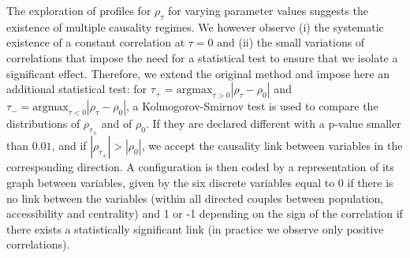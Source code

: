 \documentclass[11pt]{article}
\begin{document}
The exploration of profiles for $\rho_\tau$ for varying parameter values suggests the existence of multiple causality regimes. We however observe (i) the systematic existence of a constant correlation at $\tau = 0$ and (ii) the small variations of correlations that impose the need for a statistical test to ensure that we isolate a significant effect. Therefore, we extend the original method and impose here an additional statistical test: for $\tau_+ = \textrm{argmax}_{\tau>0} \left|\rho_{\tau} - \rho_0\right|$ and $\tau_- = \textrm{argmax}_{\tau<0} \left|\rho_{\tau} - \rho_0\right|$, a Kolmogorov-Smirnov test is used to compare the distributions of $\rho_{\tau_{\pm}}$ and of $\rho_0$. If they are declared different with a p-value smaller than $0.01$, and if $\left|\rho_{\tau_{\pm}}\right| > \left|\rho_0\right|$, we accept the causality link between variables in the corresponding direction. A configuration is then coded by a representation of its graph between variables, given by the six discrete variables equal to 0 if there is no link between the variables (within all directed couples between population, accessibility and centrality) and 1 or -1 depending on the sign of the correlation if there exists a statistically significant link (in practice we observe only positive correlations).




\end{document}
